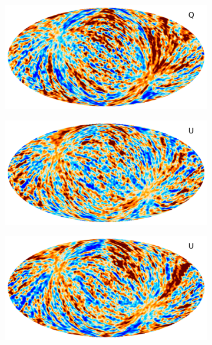 \documentclass[twocolumn]{aa}
\begin{document}
\begin{figure}[t]
    \begin{subfigure}{0.45\textwidth}
       \includegraphics[width=0.95\linewidth]{figs/ncorr_timeindep_Q.pdf}
    \end{subfigure}
    \begin{subfigure}{0.45\textwidth}
       \includegraphics[width=0.95\linewidth]{figs/ncorr_timedep_U.pdf}
    \end{subfigure}
    \begin{subfigure}{0.45\textwidth}
       \includegraphics[width=0.95\linewidth]{figs/ncorr_timeindep_U.pdf}
    \end{subfigure}
    \begin{subfigure}{0.45\textwidth}

\end{subfigure}
\end{figure}
\end{document}
